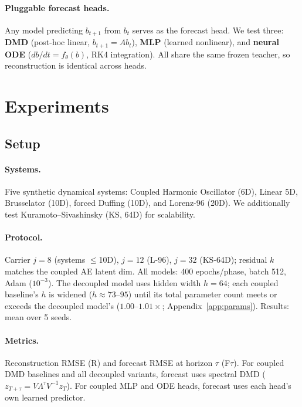 \documentclass{article}
\begin{document}
\paragraph{Pluggable forecast heads.}
\label{sec:heads}
Any model predicting $b_{t+1}$ from $b_t$ serves as the forecast
head.  We test three: \textbf{DMD} (post-hoc linear,
$b_{t+1} = Ab_t$), \textbf{MLP} (learned nonlinear), and
\textbf{neural ODE} ($db/dt = f_\theta(b)$, RK4 integration).
All share the same frozen teacher, so reconstruction is identical
across heads.


\section{Experiments}
\label{sec:experiments}

\subsection{Setup}

\paragraph{Systems.}
Five synthetic dynamical systems: Coupled Harmonic Oscillator
(6D), Linear 5D, Brusselator (10D), forced Duffing
(10D), and Lorenz-96 (20D).  We additionally test
Kuramoto--Sivashinsky (KS, 64D) for scalability.

\paragraph{Protocol.}
Carrier $j{=}8$ (systems $\le$10D), $j{=}12$ (L-96), $j{=}32$
(KS-64D); residual $k$ matches the coupled AE latent dim.
All models: 400 epochs/phase, batch 512, Adam ($10^{-3}$).
The decoupled model uses hidden width $h{=}64$; each coupled
baseline's $h$ is widened ($h{\approx}73$--$95$) until its total
parameter count meets or exceeds the decoupled model's
($1.00$--$1.01\times$; Appendix~\ref{app:params}).
Results: mean over 5 seeds.

\paragraph{Metrics.}
Reconstruction RMSE (R) and forecast RMSE at horizon $\tau$ (F$\tau$).
For coupled DMD baselines and all decoupled variants, forecast uses
spectral DMD ($z_{T+\tau} = V\Lambda^\tau V^{-1} z_T$).
For coupled MLP and ODE heads, forecast uses each head's own
learned predictor.
\end{document}
